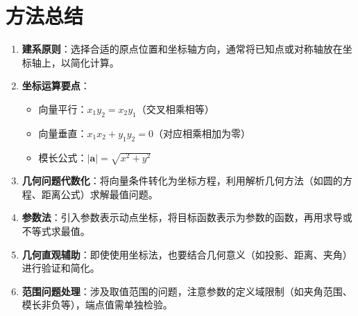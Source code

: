 \documentclass[11pt]{ctexrep}
\begin{document}
\section*{方法总结}

\begin{enumerate}
    \item \textbf{建系原则}：选择合适的原点位置和坐标轴方向，通常将已知点或对称轴放在坐标轴上，以简化计算。
    
    \item \textbf{坐标运算要点}：
    \begin{itemize}
        \item 向量平行：$x_1y_2 = x_2y_1$（交叉相乘相等）
        \item 向量垂直：$x_1x_2 + y_1y_2 = 0$（对应相乘相加为零）
        \item 模长公式：$|\boldsymbol{a}| = \sqrt{x^2+y^2}$
    \end{itemize}
    
    \item \textbf{几何问题代数化}：将向量条件转化为坐标方程，利用解析几何方法（如圆的方程、距离公式）求解最值问题。
    
    \item \textbf{参数法}：引入参数表示动点坐标，将目标函数表示为参数的函数，再用求导或不等式求最值。
    
    \item \textbf{几何直观辅助}：即使使用坐标法，也要结合几何意义（如投影、距离、夹角）进行验证和简化。
    
    \item \textbf{范围问题处理}：涉及取值范围的问题，注意参数的定义域限制（如夹角范围、模长非负等），端点值需单独检验。
\end{enumerate}
\end{document}
